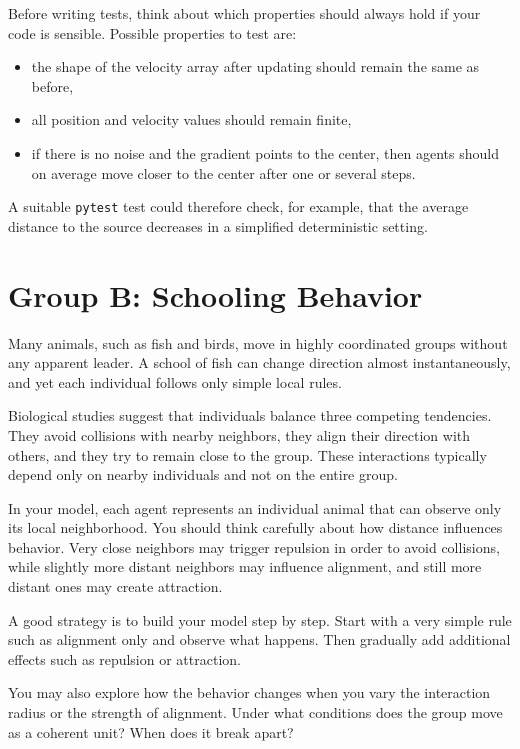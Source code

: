 \documentclass[paper=letter, fontsize=12pt]{article}
\numberwithin{equation}{section}
\begin{document}
\begin{testbox}
Before writing tests, think about which properties should always hold if your code is sensible. Possible properties to test are:
\begin{itemize}
\item the shape of the velocity array after updating should remain the same as before,
\item all position and velocity values should remain finite,
\item if there is no noise and the gradient points to the center, then agents should on average move closer to the center after one or several steps.
\end{itemize}
A suitable \texttt{pytest} test could therefore check, for example, that the average distance to the source decreases in a simplified deterministic setting.
\end{testbox}

\section*{Group B: Schooling Behavior}

Many animals, such as fish and birds, move in highly coordinated groups without any apparent leader. A school of fish can change direction almost instantaneously, and yet each individual follows only simple local rules.

Biological studies suggest that individuals balance three competing tendencies. They avoid collisions with nearby neighbors, they align their direction with others, and they try to remain close to the group. These interactions typically depend only on nearby individuals and not on the entire group.

In your model, each agent represents an individual animal that can observe only its local neighborhood. You should think carefully about how distance influences behavior. Very close neighbors may trigger repulsion in order to avoid collisions, while slightly more distant neighbors may influence alignment, and still more distant ones may create attraction.

A good strategy is to build your model step by step. Start with a very simple rule such as alignment only and observe what happens. Then gradually add additional effects such as repulsion or attraction.

You may also explore how the behavior changes when you vary the interaction radius or the strength of alignment. Under what conditions does the group move as a coherent unit? When does it break apart?
\end{document}

